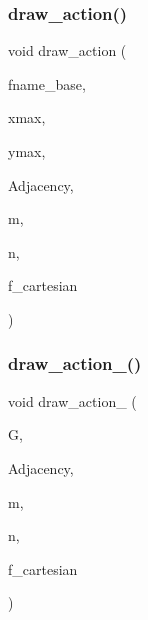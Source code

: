 \mbox{\label{test_8_c_a1bef40aefd5d924e54a3b2b8c667b618}} 
\subsubsection{\texorpdfstring{draw\+\_\+action()}{draw\_action()}}
{\footnotesize\ttfamily void draw\+\_\+action (\begin{DoxyParamCaption}\item[{char $\ast$}]{fname\+\_\+base,  }\item[{\mbox{\hyperlink{galois_8h_a09fddde158a3a20bd2dcadb609de11dc}{I\+NT}}}]{xmax,  }\item[{\mbox{\hyperlink{galois_8h_a09fddde158a3a20bd2dcadb609de11dc}{I\+NT}}}]{ymax,  }\item[{\mbox{\hyperlink{galois_8h_a09fddde158a3a20bd2dcadb609de11dc}{I\+NT}} $\ast$}]{Adjacency,  }\item[{\mbox{\hyperlink{galois_8h_a09fddde158a3a20bd2dcadb609de11dc}{I\+NT}}}]{m,  }\item[{\mbox{\hyperlink{galois_8h_a09fddde158a3a20bd2dcadb609de11dc}{I\+NT}}}]{n,  }\item[{\mbox{\hyperlink{galois_8h_a09fddde158a3a20bd2dcadb609de11dc}{I\+NT}}}]{f\+\_\+cartesian }\end{DoxyParamCaption})}

\mbox{\label{test_8_c_a66d5226d368c0fb8c9578ff6f3462dfc}} 
\subsubsection{\texorpdfstring{draw\+\_\+action\+\_\+()}{draw\_action\_()}}
{\footnotesize\ttfamily void draw\+\_\+action\+\_\+ (\begin{DoxyParamCaption}\item[{\mbox{\hyperlink{classmp__graphics}{mp\+\_\+graphics}} \&}]{G,  }\item[{\mbox{\hyperlink{galois_8h_a09fddde158a3a20bd2dcadb609de11dc}{I\+NT}} $\ast$}]{Adjacency,  }\item[{\mbox{\hyperlink{galois_8h_a09fddde158a3a20bd2dcadb609de11dc}{I\+NT}}}]{m,  }\item[{\mbox{\hyperlink{galois_8h_a09fddde158a3a20bd2dcadb609de11dc}{I\+NT}}}]{n,  }\item[{\mbox{\hyperlink{galois_8h_a09fddde158a3a20bd2dcadb609de11dc}{I\+NT}}}]{f\+\_\+cartesian }\end{DoxyParamCaption})}

